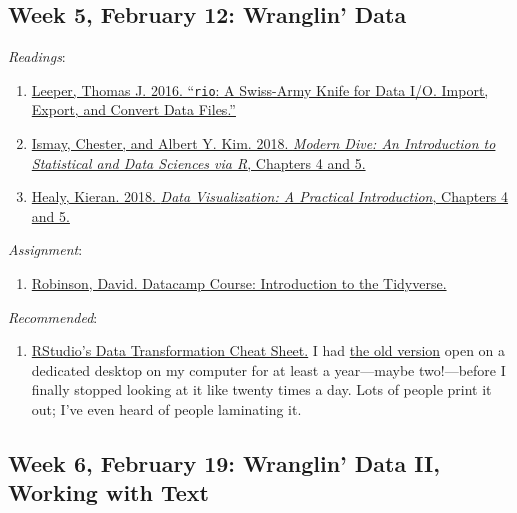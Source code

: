 \documentclass[]{article}
\providecommand{\tightlist}{%
  \setlength{\itemsep}{0pt}\setlength{\parskip}{0pt}}
\begin{document}
\hypertarget{week-5-february-12-wranglin-data}{%
\subsection{Week 5, February 12: Wranglin'
Data}\label{week-5-february-12-wranglin-data}}

\emph{Readings}:

\begin{enumerate}
\def\labelenumi{\arabic{enumi}.}
\tightlist
\item
  \href{https://cran.r-project.org/web/packages/rio/vignettes/rio.html}{Leeper,
  Thomas J. 2016. ``\texttt{rio}: A Swiss-Army Knife for Data I/O.
  Import, Export, and Convert Data Files.''}
\item
  \href{https://moderndive.com/4-tidy.html}{Ismay, Chester, and Albert
  Y. Kim. 2018. \emph{Modern Dive: An Introduction to Statistical and
  Data Sciences via R}, Chapters 4 and 5.}
\item
  \href{https://socviz.co/groupfacettx.html}{Healy, Kieran. 2018.
  \emph{Data Visualization: A Practical Introduction}, Chapters 4 and
  5.}
\end{enumerate}

\emph{Assignment}:

\begin{enumerate}
\def\labelenumi{\arabic{enumi}.}
\tightlist
\item
  \href{https://www.datacamp.com/courses/introduction-to-the-tidyverse}{Robinson,
  David. Datacamp Course: Introduction to the Tidyverse.}
\end{enumerate}

\emph{Recommended}:

\begin{enumerate}
\def\labelenumi{\arabic{enumi}.}
\tightlist
\item
  \href{https://github.com/rstudio/cheatsheets/raw/master/data-transformation.pdf}{RStudio's
  Data Transformation Cheat Sheet.} I had
  \href{https://www.rstudio.com/wp-content/uploads/2015/02/data-wrangling-cheatsheet.pdf}{the
  old version} open on a dedicated desktop on my computer for at least a
  year---maybe two!---before I finally stopped looking at it like twenty
  times a day. Lots of people print it out; I've even heard of people
  laminating it.
\end{enumerate}

\hypertarget{week-6-february-19-wranglin-data-ii-working-with-text}{%
\subsection{Week 6, February 19: Wranglin' Data II, Working with
Text}\label{week-6-february-19-wranglin-data-ii-working-with-text}}
\end{document}
